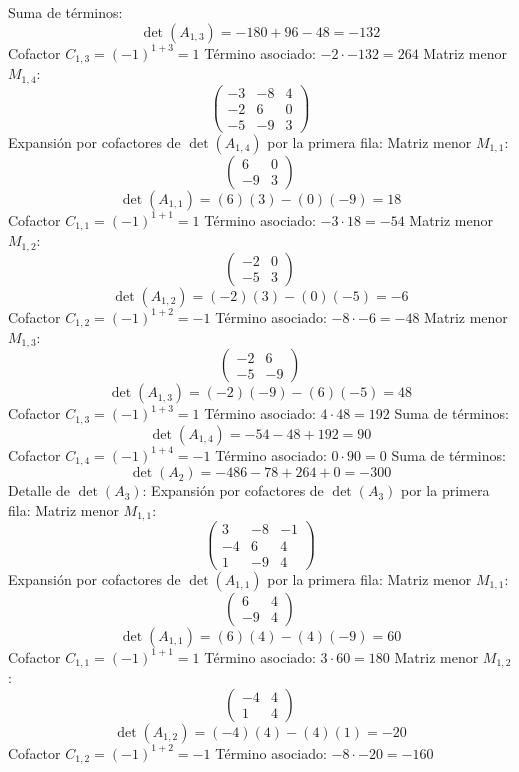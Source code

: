 \documentclass{article}
\begin{document}
Suma de términos:
\[\det(A_{1,3}) = -180 + 96 - 48 = -132\]
Cofactor $C_{1,3} = (-1)^{1+3} = 1$
Término asociado: $ -2 \cdot -132 = 264 $
Matriz menor $M_{1,4}$:
\[\begin{pmatrix}-3 & -8 & 4 \\ -2 & 6 & 0 \\ -5 & -9 & 3\end{pmatrix}\]
Expansión por cofactores de $\det(A_{1,4})$ por la primera fila:
Matriz menor $M_{1,1}$:
\[\begin{pmatrix}6 & 0 \\ -9 & 3\end{pmatrix}\]
\[\det(A_{1,1}) = (6)(3) - (0)(-9) = 18\]
Cofactor $C_{1,1} = (-1)^{1+1} = 1$
Término asociado: $ -3 \cdot 18 = -54 $
Matriz menor $M_{1,2}$:
\[\begin{pmatrix}-2 & 0 \\ -5 & 3\end{pmatrix}\]
\[\det(A_{1,2}) = (-2)(3) - (0)(-5) = -6\]
Cofactor $C_{1,2} = (-1)^{1+2} = -1$
Término asociado: $ -8 \cdot -6 = -48 $
Matriz menor $M_{1,3}$:
\[\begin{pmatrix}-2 & 6 \\ -5 & -9\end{pmatrix}\]
\[\det(A_{1,3}) = (-2)(-9) - (6)(-5) = 48\]
Cofactor $C_{1,3} = (-1)^{1+3} = 1$
Término asociado: $ 4 \cdot 48 = 192 $
Suma de términos:
\[\det(A_{1,4}) = -54 - 48 + 192 = 90\]
Cofactor $C_{1,4} = (-1)^{1+4} = -1$
Término asociado: $ 0 \cdot 90 = 0 $
Suma de términos:
\[\det(A_{2}) = -486 - 78 + 264 + 0 = -300\]
Detalle de $\det(A_{3})$:
Expansión por cofactores de $\det(A_{3})$ por la primera fila:
Matriz menor $M_{1,1}$:
\[\begin{pmatrix}3 & -8 & -1 \\ -4 & 6 & 4 \\ 1 & -9 & 4\end{pmatrix}\]
Expansión por cofactores de $\det(A_{1,1})$ por la primera fila:
Matriz menor $M_{1,1}$:
\[\begin{pmatrix}6 & 4 \\ -9 & 4\end{pmatrix}\]
\[\det(A_{1,1}) = (6)(4) - (4)(-9) = 60\]
Cofactor $C_{1,1} = (-1)^{1+1} = 1$
Término asociado: $ 3 \cdot 60 = 180 $
Matriz menor $M_{1,2}$:
\[\begin{pmatrix}-4 & 4 \\ 1 & 4\end{pmatrix}\]
\[\det(A_{1,2}) = (-4)(4) - (4)(1) = -20\]
Cofactor $C_{1,2} = (-1)^{1+2} = -1$
Término asociado: $ -8 \cdot -20 = -160 $
\end{document}

